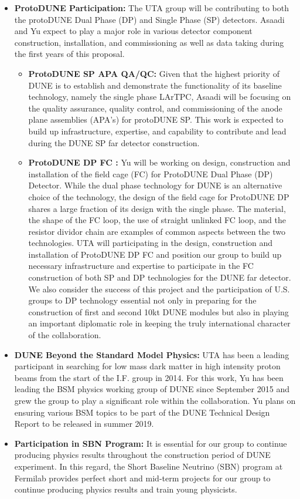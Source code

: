 \begin{itemize}

\item {{\bf ProtoDUNE Participation:} The UTA group will be contributing to both the protoDUNE Dual Phase (DP) and Single Phase (SP) detectors. Asaadi and Yu expect to play a major role in various detector component construction, installation, and commissioning as well as data taking during the first years of this proposal.}

\begin{itemize}
\item {{\bf ProtoDUNE SP APA QA/QC:} Given that the highest priority of DUNE is to establish and demonstrate the functionality of its baseline technology, namely the single phase LArTPC, Asaadi will be focusing on the quality assurance, quality control, and commissioning of the anode plane assemblies (APA's) for protoDUNE SP. This work is expected to build up infrastructure, expertise, and capability to contribute and lead during the DUNE SP far detector construction.}

\item {{\bf ProtoDUNE DP FC :} Yu will be working on design, construction and installation of the field cage (FC) for ProtoDUNE Dual Phase (DP) Detector. While the dual phase technology for DUNE is an alternative choice of the technology, the design of the field cage for ProtoDUNE DP shares a large fraction of its design with the single phase. The material, the shape of the FC loop, the use of straight unlinked FC loop, and the resistor dividor chain are examples of common aspects between the two technologies.  UTA will participating in the design, construction and installation of ProtoDUNE DP FC and position our group to build up necessary infrastructure and expertise to participate in the FC construction of both SP and DP technologies for the DUNE far detector.  We also consider the success of this project and the participation of U.S. groups to DP technology essential not only in preparing for the construction of first and second 10kt DUNE modules but also in playing an important diplomatic role in keeping the truly international character of the collaboration.}

\end{itemize}

\item {{\bf DUNE Beyond the Standard Model Physics:} UTA has been a leading participant in searching for low mass dark matter in high intensity proton beams from the start of the I.F. group in 2014.   For this work, Yu has been leading the BSM physics working group of DUNE since September 2015 and grew the group to play a significant role within the collaboration.   Yu plans on ensuring various BSM topics to be part of the DUNE Technical Design Report to be released in summer 2019.}
\item{{\bf Participation in SBN Program:} It is essential for our group to continue producing physics results throughout the construction period of DUNE experiment.   In this regard, the Short Baseline Neutrino (SBN) program at Fermilab provides perfect short and mid-term projects for our group to continue producing physics results and train young physicists.}



\end{itemize}
